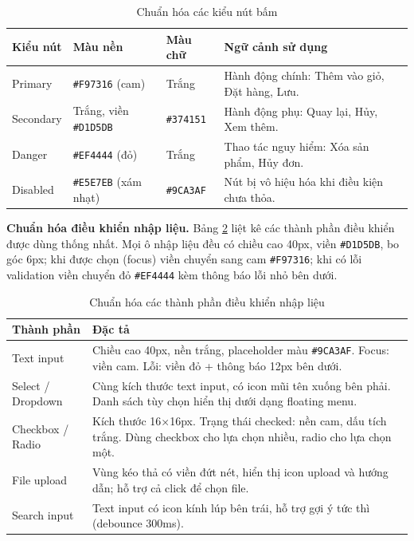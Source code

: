 \documentclass[../DoAn.tex]{subfiles}
\begin{document}
\begin{table}[H]
    \centering
    \caption{Chuẩn hóa các kiểu nút bấm}
    \label{table:ui_button}
    \small
    \setlength{\tabcolsep}{4pt}
    \begin{tabular}{|>{\raggedright\arraybackslash}p{2.4cm}|>{\raggedright\arraybackslash}p{2.4cm}|>{\raggedright\arraybackslash}p{2.0cm}|>{\raggedright\arraybackslash}p{6.0cm}|}
        \hline
        \textbf{Kiểu nút} & \textbf{Màu nền} & \textbf{Màu chữ} & \textbf{Ngữ cảnh sử dụng} \\ \hline
        Primary & \texttt{\#F97316} (cam) & Trắng & Hành động chính: Thêm vào giỏ, Đặt hàng, Lưu. \\ \hline
        Secondary & Trắng, viền \texttt{\#D1D5DB} & \texttt{\#374151} & Hành động phụ: Quay lại, Hủy, Xem thêm. \\ \hline
        Danger & \texttt{\#EF4444} (đỏ) & Trắng & Thao tác nguy hiểm: Xóa sản phẩm, Hủy đơn. \\ \hline
        Disabled & \texttt{\#E5E7EB} (xám nhạt) & \texttt{\#9CA3AF} & Nút bị vô hiệu hóa khi điều kiện chưa thỏa. \\ \hline
    \end{tabular}
\end{table}

\textbf{Chuẩn hóa điều khiển nhập liệu.} Bảng \ref{table:ui_control} liệt kê các thành phần điều khiển được dùng thống nhất. Mọi ô nhập liệu đều có chiều cao 40px, viền \texttt{\#D1D5DB}, bo góc 6px; khi được chọn (focus) viền chuyển sang cam \texttt{\#F97316}; khi có lỗi validation viền chuyển đỏ \texttt{\#EF4444} kèm thông báo lỗi nhỏ bên dưới.

\begin{table}[H]
    \centering
    \caption{Chuẩn hóa các thành phần điều khiển nhập liệu}
    \label{table:ui_control}
    \small
    \setlength{\tabcolsep}{4pt}
    \begin{tabular}{|>{\raggedright\arraybackslash}p{2.8cm}|>{\raggedright\arraybackslash}p{10.7cm}|}
        \hline
        \textbf{Thành phần} & \textbf{Đặc tả} \\ \hline
        Text input & Chiều cao 40px, nền trắng, placeholder màu \texttt{\#9CA3AF}. Focus: viền cam. Lỗi: viền đỏ + thông báo 12px bên dưới. \\ \hline
        Select / Dropdown & Cùng kích thước text input, có icon mũi tên xuống bên phải. Danh sách tùy chọn hiển thị dưới dạng floating menu. \\ \hline
        Checkbox / Radio & Kích thước 16×16px. Trạng thái checked: nền cam, dấu tích trắng. Dùng checkbox cho lựa chọn nhiều, radio cho lựa chọn một. \\ \hline
        File upload & Vùng kéo thả có viền đứt nét, hiển thị icon upload và hướng dẫn; hỗ trợ cả click để chọn file. \\ \hline
        Search input & Text input có icon kính lúp bên trái, hỗ trợ gợi ý tức thì (debounce 300ms). \\ \hline
    \end{tabular}
\end{table}
\end{document}
